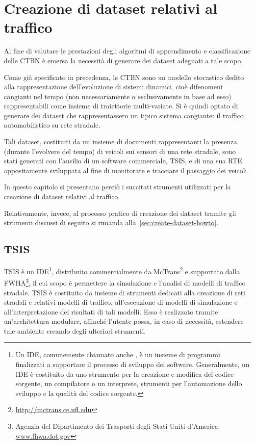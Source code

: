 
\chapter{Creazione di dataset relativi al traffico}
\label{cap:tsis-sensors}
Al fine di valutare le prestazioni degli algoritmi di apprendimento e classificazione delle \acl{CTBN} è emersa la necessità di generare dei dataset adeguati a tale scopo.

Come già specificato in precedenza, le \acs{CTBN} sono un modello stocastico dedito alla rappresentazione dell'evoluzione di sistemi dinamici, cioè difenomeni cangianti nel tempo (non necessariamente o esclusivamente in base ad esso) rappresentabili come insieme di traiettorie multi-variate. Si è quindi optato di generare dei dataset che rappresentassero un tipico sistema cangiante: il traffico automobilistico su rete stradale.

Tali dataset, costituiti da un insieme di documenti rappresentanti la presenza (durante l'evolvere del tempo) di veicoli sui sensori di una rete stradale, sono stati generati con l'ausilio di un software commerciale, \acf{TSIS}, e di una sua \acl{RTE} appositamente sviluppata al fine di monitorare e tracciare il passaggio dei veicoli. 

In questo capitolo si presentano perciò i succitati strumenti utilizzati per la creazione di dataset relativi al traffico.

Relativamente, invece, al processo pratico di creazione dei dataset tramite gli strumenti discussi di seguito si rimanda alla~\autoref{sec:create-dataset-howto}.

\section{TSIS}

\acf{TSIS} è un \acl{IDE}\footnote{Un \acl{IDE}, comunemente chiamato anche , è un insieme di programmi finalizzati a supportare il processo di sviluppo dei software. Generalmente, un \acs{IDE} è costituito da uno strumento per la creazione e modifica del codice sorgente, un compilatore o un interprete, strumenti per l'automazione dello sviluppo e la qualità del codice sorgente.}, distribuito commercialmente da McTrans\footnote{\url{http://mctrans.ce.ufl.edu}} e supportato dalla \acf{FWHA}\footnote{Agenzia del Dipartimento dei Trasporti degli Stati Uniti d'America: \\ \url{www.fhwa.dot.gov}}, il cui scopo è permettere la simulazione e l'analisi di modelli di traffico stradale. \acs{TSIS} è costituito da insieme di strumenti dedicati alla creazione di reti stradali e relativi modelli di traffico, all'esecuzione di modelli di simulazione e all'interpretazione dei risultati di tali modelli. Esso è realizzato tramite un'architettura modulare, affinché l'utente possa, in caso di necessità, estendere tale ambiente creando degli ulteriori strumenti.

